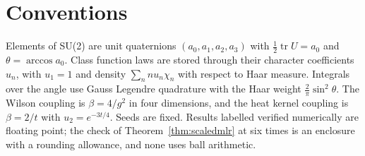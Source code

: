 \section{Conventions}

Elements of SU(2) are unit quaternions $(a_0,a_1,a_2,a_3)$ with $\frac12\operatorname{tr}U=a_0$ and $\theta=\arccos a_0$. Class function laws are stored through their character coefficients $u_n$, with $u_1=1$ and density $\sum_nnu_n\chi_n$ with respect to Haar measure. Integrals over the angle use Gauss Legendre quadrature with the Haar weight $\frac2\pi\sin^2\theta$. The Wilson coupling is $\beta=4/g^2$ in four dimensions, and the heat kernel coupling is $\beta=2/t$ with $u_2=e^{-3t/4}$. Seeds are fixed. Results labelled verified numerically are floating point; the check of Theorem~\ref{thm:scaledmlr} at six times is an enclosure with a rounding allowance, and none uses ball arithmetic.
